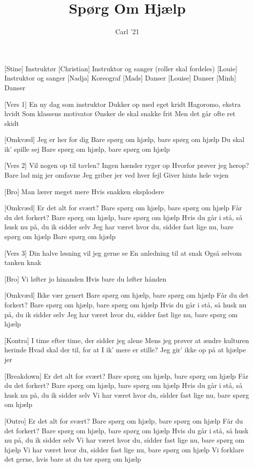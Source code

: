 \documentclass[a4paper,11pt]{article}
\title{Spørg Om Hjælp}
\author{Carl '21}
\begin{document}
\maketitle

\begin{roles}
[Stine] Instruktør
[Christian] Instruktor og sanger (roller skal fordeles)
[Louie] Instruktor og sanger
[Nadja] Koreograf
[Mads] Danser
[Louise] Danser
[Minh] Danser
\end{roles}

\begin{song}
[Vers 1] En ny dag som instruktor
    Dukker op med eget kridt
    Hagoromo, ekstra hvidt
    Som klassens motivator
    Ønsker de skal snakke frit
    Men det går ofte ret skidt

[Omkvæd] Jeg er her for dig
    Bare spørg om hjælp, bare spørg om hjælp
    Du skal ik' spille sej
    Bare spørg om hjælp, bare spørg om hjælp

[Vers 2] Vil nogen op til tavlen?
    Ingen hænder ryger op
    Hvorfor prøver jeg herop?
    Bare lad mig jer omfavne
    Jeg griber jer ved hver fejl
    Giver hints hele vejen

[Bro] Man lærer meget mere
    Hvis snakken eksplodere

[Omkvæd] Er det alt for svært?
    Bare spørg om hjælp, bare spørg om hjælp
    Får du det forkert?
    Bare spørg om hjælp, bare spørg om hjælp
    Hvis du går i stå, så husk nu på, du ik sidder selv
    Jeg har været hvor du, sidder fast lige nu, bare spørg om hjælp
    Bare spørg om hjælp

[Vers 3] Din halve løsning vil jeg gerne se
    En anledning til at snak
    Også selvom tanken knak

[Bro] Vi løfter jo hinanden
    Hvis bare du løfter hånden

[Omkvæd] Ikke vær genert
    Bare spørg om hjælp, bare spørg om hjælp
    Får du det forkert?
    Bare spørg om hjælp, bare spørg om hjælp
    Hvis du går i stå, så husk nu på, du ik sidder selv
    Jeg har været hvor du, sidder fast lige nu, bare spørg om hjælp

[Kontra] I time efter time, der sidder jeg alene
    Mens jeg prøver at ændre kulturen herinde
    Hvad skal der til, for at I ik' mere er stille?
    Jeg gir' ikke op på at hjælpe jer
    

[Breakdown] Er det alt for svært?
    Bare spørg om hjælp, bare spørg om hjælp
    Får du det forkert?
    Bare spørg om hjælp, bare spørg om hjælp
    Hvis du går i stå, så husk nu på, du ik sidder selv
    Vi har været hvor du, sidder fast lige nu, bare spørg om hjælp

[Outro] Er det alt for svært?
    Bare spørg om hjælp, bare spørg om hjælp
    Får du det forkert?
    Bare spørg om hjælp, bare spørg om hjælp
    Hvis du går i stå, så husk nu på, du ik sidder selv
    Vi har været hvor du, sidder fast lige nu, bare spørg om hjælp
    Vi har været hvor du, sidder fast lige nu, bare spørg om hjælp
    Vi forklare det gerne, hvis bare at du tør spørg om hjælp
\end{song}
\end{document}
